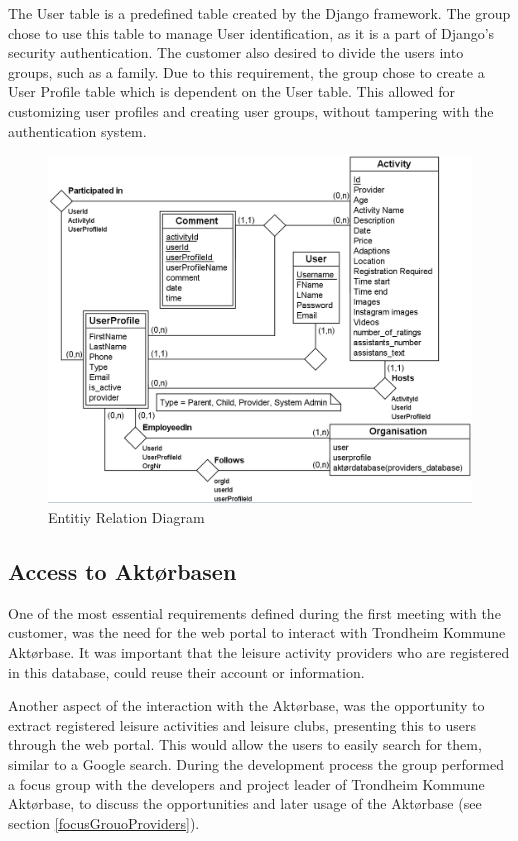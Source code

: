The User table is a predefined table created by the Django framework. The group chose to use this table to manage User identification, as it is a part of Django's security authentication. The customer also desired to divide the users into groups, such as a family. Due to this requirement, the group chose to create a User Profile table which is dependent on the User table. This allowed for customizing user profiles and creating user groups, without tampering with the authentication system.

\begin{figure}[ht]
\centering
    \includegraphics[width=1.0\textwidth]{fig/database_diagram_tett}
\caption{Entitiy Relation Diagram}
\label{Database_Figure}
\end{figure}


\subsection{Access to Aktørbasen}
\label{Aktordatabasen}
One of the most essential requirements defined during the first meeting with the customer, was the need for the web portal to interact with Trondheim Kommune Aktørbase. It was important that the leisure activity providers who are registered in this database, could reuse their account or information.

Another aspect of the interaction with the Aktørbase, was the opportunity to extract registered leisure activities and leisure clubs, presenting this to users through the  web portal. This would allow the users to easily search for them, similar to a Google search. During the development process the group performed a focus group with the developers and project leader of Trondheim Kommune Aktørbase, to discuss the opportunities and later usage of the Aktørbase (see section \ref{focusGrouoProviders}).

